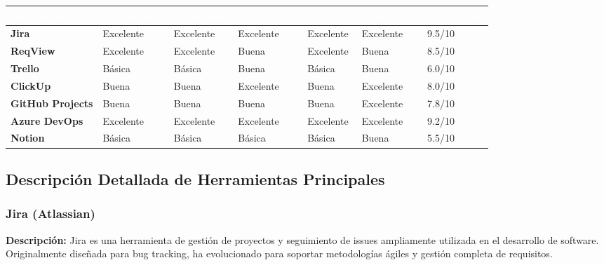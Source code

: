 \documentclass[12pt,a4paper]{article}
\begin{document}
\begin{longtable}{|p{2.5cm}|p{1.5cm}|p{1.5cm}|p{1.5cm}|p{1.5cm}|p{1.5cm}|p{1.5cm}|}
\hline
\rowcolor{headercolor}
\textcolor{white}{\textbf{Herramienta}} & 
\textcolor{white}{\textbf{Trazabilidad}} & 
\textcolor{white}{\textbf{Versionado}} & 
\textcolor{white}{\textbf{Priorización}} & 
\textcolor{white}{\textbf{Reportes}} & 
\textcolor{white}{\textbf{Integración}} & 
\textcolor{white}{\textbf{Puntuación}} \\
\hline

\textbf{Jira} & 
Excelente & 
Excelente & 
Excelente & 
Excelente & 
Excelente & 
9.5/10 \\
\hline
\rowcolor{lightgray}

\textbf{ReqView} & 
Excelente & 
Excelente & 
Buena & 
Excelente & 
Buena & 
8.5/10 \\
\hline

\textbf{Trello} & 
Básica & 
Básica & 
Buena & 
Básica & 
Buena & 
6.0/10 \\
\hline
\rowcolor{lightgray}

\textbf{ClickUp} & 
Buena & 
Buena & 
Excelente & 
Buena & 
Excelente & 
8.0/10 \\
\hline

\textbf{GitHub Projects} & 
Buena & 
Buena & 
Buena & 
Buena & 
Excelente & 
7.8/10 \\
\hline
\rowcolor{lightgray}

\textbf{Azure DevOps} & 
Excelente & 
Excelente & 
Excelente & 
Excelente & 
Excelente & 
9.2/10 \\
\hline

\textbf{Notion} & 
Básica & 
Básica & 
Básica & 
Básica & 
Buena & 
5.5/10 \\
\hline

\end{longtable}

\subsection{Descripción Detallada de Herramientas Principales}

\subsubsection{Jira (Atlassian)}

\textbf{Descripción:}
Jira es una herramienta de gestión de proyectos y seguimiento de issues ampliamente utilizada en el desarrollo de software. Originalmente diseñada para bug tracking, ha evolucionado para soportar metodologías ágiles y gestión completa de requisitos.
\end{document}
